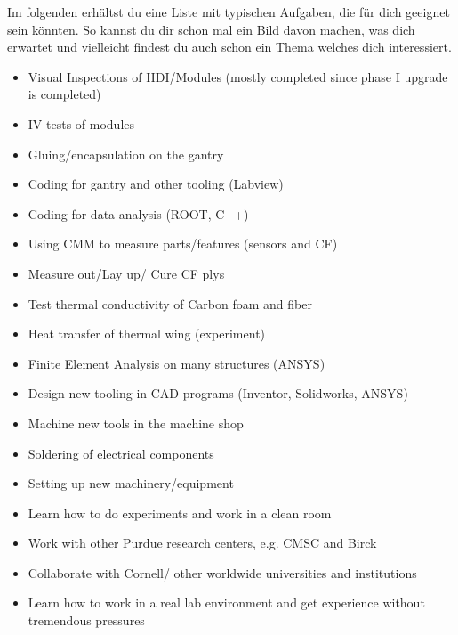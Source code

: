 \documentclass[
  paper=a4,
  fontsize=12pt,
  DIV=16,
  headheight=52pt,
  footheight=45pt,
  headinclude,
  parskip=full,
]{scrartcl}
\begin{document}
Im folgenden erhältst du eine Liste mit typischen Aufgaben, die für dich
geeignet sein könnten.
So kannst du dir schon mal ein Bild davon machen, was dich erwartet und vielleicht
findest du auch schon ein Thema welches dich interessiert.
\begin{itemize}
  \item Visual Inspections of HDI/Modules (mostly completed since phase I
  upgrade is completed)
  \item IV tests of modules
  \item Gluing/encapsulation on the gantry
  \item Coding for gantry and other tooling (Labview)
  \item Coding for data analysis (ROOT, C++)
  \item Using CMM to measure parts/features (sensors and CF)
  \item Measure out/Lay up/ Cure CF plys
  \item Test thermal conductivity of Carbon foam and fiber
  \item Heat transfer of thermal wing (experiment)
  \item Finite Element Analysis on many structures (ANSYS)
  \item Design new tooling in CAD programs (Inventor, Solidworks, ANSYS)
  \item Machine new tools in the machine shop
  \item Soldering of electrical components
  \item Setting up new machinery/equipment
  \item Learn how to do experiments and work in a clean room
  \item Work with other Purdue research centers, e.g. CMSC and Birck
  \item Collaborate with Cornell/ other worldwide universities and institutions
  \item Learn how to work in a real lab environment and get experience without
  tremendous pressures
\end{itemize}
\end{document}
